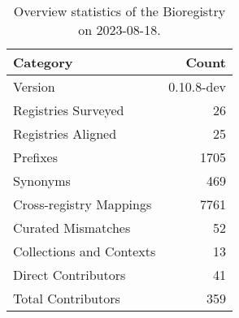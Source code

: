 \begin{table}
\caption{Overview statistics of the Bioregistry on 2023-08-18.}
\label{tab:bioregistry-summary}
\begin{tabular}{lr}
\toprule
Category & Count \\
\midrule
Version & 0.10.8-dev \\
Registries Surveyed & 26 \\
Registries Aligned & 25 \\
Prefixes & 1705 \\
Synonyms & 469 \\
Cross-registry Mappings & 7761 \\
Curated Mismatches & 52 \\
Collections and Contexts & 13 \\
Direct Contributors & 41 \\
Total Contributors & 359 \\
\bottomrule
\end{tabular}
\end{table}

